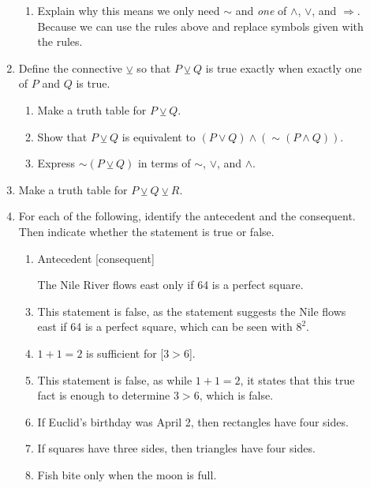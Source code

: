 \documentclass{letter}
\begin{document}
\begin{description}
\begin{enumerate}
\begin{enumerate}
				\item Explain why this means we only need $\sim$ and {\em one} of $\wedge$, $\vee$, and $\Rightarrow$. \\
                                   Because we can use the rules above and replace symbols given with the rules.
			\end{enumerate}
	\item Define the connective $\veebar$ so that $P\veebar Q$ is true exactly when exactly one of $P$ and $Q$ is true.
			\begin{enumerate}\itemsep=1.25mm
				\item Make a truth table for $P\veebar Q$.
				\item Show that $P\veebar Q$ is equivalent to $(P\vee Q)\wedge (\sim (P\wedge Q))$.
				\item Express $\sim (P\veebar Q)$ in terms of $\sim$, $\vee$, and $\wedge$. 
			\end{enumerate}
	\item Make a truth table for $P\veebar Q\veebar R$.
	\item For each of the following, identify the antecedent and the consequent. Then indicate whether the statement is true or false.
		\begin{enumerate}
                        \item {Antecedent} [consequent]
			\item [The Nile River flows east] only if {64 is a perfect square}. \\ 
                        \item This statement is false, as the statement suggests the Nile flows east if 64 is a perfect square, which can be seen with $8^2$. \\ 
			\item {$1+1=2$ is sufficient} for [$3>6$]. \\ 
                        \item This statement is false, as while $1+1=2$, it states that this true fact is enough to determine $3>6$, which is false. \\
			\item If Euclid's birthday was April 2, then rectangles have four sides. \\
			\item If squares have three sides, then triangles have four sides. \\
			\item Fish bite only when the moon is full. \\

\end{enumerate}
\end{enumerate}
\end{description}
\end{document}
